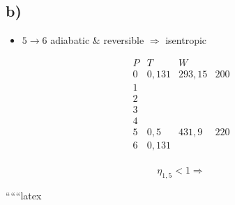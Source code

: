 

\subsection*{b)}

\begin{itemize}
    \item \( 5 \rightarrow 6 \) adiabatic \& reversible \(\Rightarrow\) isentropic
\end{itemize}

\[
\begin{array}{cccc}
P & T & W \\
0 & 0,131 & 293,15 & 200 \\
1 & & & \\
2 & & & \\
3 & & & \\
4 & & & \\
5 & 0,5 & 431,9 & 220 \\
6 & 0,131 & & \\
\end{array}
\]

\[
\eta_{1,5} < 1 \Rightarrow
\]

``````latex